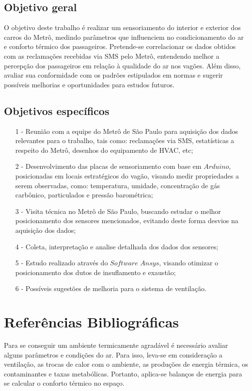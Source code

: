 \documentclass[acronym,symbols]{fei}
\begin{document}
\section{Objetivo geral}

O objetivo deste trabalho é realizar um sensoriamento do interior e exterior dos carros do Metrô, medindo parâmetros que influenciem no condicionamento do ar e conforto térmico dos passageiros. Pretende-se correlacionar os dados obtidos com as reclamações recebidas via SMS pelo Metrô, entendendo melhor a percepção dos passageiros em relação à qualidade do ar nos vagões. Além disso, avaliar sua conformidade com os padrões estipulados em normas e sugerir possíveis melhorias e oportunidades para estudos futuros.

\section{Objetivos específicos}

\begin{itemize}
    \item[1 -]Reunião com a equipe do Metrô de São Paulo para aquisição dos dados relevantes para o trabalho, tais como: reclamações via SMS, estatísticas a respeito do Metrô, desenhos do equipamento de HVAC, etc; 
    \item[2 -]Desenvolvimento das placas de sensoriamento com base em $Arduino$, posicionadas em locais estratégicos do vagão, visando medir propriedades a serem observadas, como: temperatura, umidade, concentração de gás carbônico, particulados e pressão barométrica;
    \item[3 -]Visita técnica no Metrô de São Paulo, buscando estudar o melhor posicionamento dos sensores mencionados, evitando deste forma desvios na aquisição dos dados;
    \item[4 -]Coleta, interpretação e analise detalhada dos dados dos sensores;
    \item[5 -]Estudo realizado através do $Software$ $Ansys$, visando otimizar o posicionamento dos dutos de insuflamento e exaustão;
    \item[6 -]Possíveis sugestões de melhoria para o sistema de ventilação.
\end{itemize}

\chapter{Referências Bibliográficas}

Para se conseguir um ambiente termicamente agradável é necessário avaliar alguns parâmetros e condições do ar. Para isso, leva-se em consideração a ventilação, as trocas de calor com o ambiente, as produções de energia térmica, os contaminantes e taxas metabólicas. Portanto, aplica-se balanços de energia para se calcular o conforto térmico no espaço.
\end{document}
